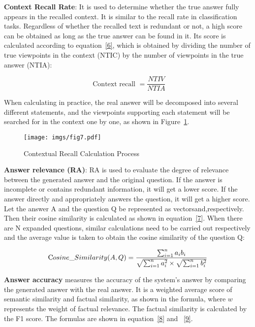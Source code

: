 \textbf{Context Recall Rate}: It is used to determine whether the true answer fully appears in the recalled context. It is similar to the recall rate in classification tasks. Regardless of whether the recalled text is redundant or not, a high score can be obtained as long as the true answer can be found in it. Its score is calculated according to equation~\ref{6}, which is obtained by dividing the number of true viewpoints in the context (NTIC) by the number of viewpoints in the true answer (NTIA): 

\begin{equation}
\text { Context recall }=\frac{NTIV}{NTIA}
\label{6}
\end{equation}

When calculating in practice, the real answer will be decomposed into several different statements, and the viewpoints supporting each statement will be searched for in the context one by one, as shown in Figure~\ref{fig:fig7}.
\begin{figure} [h] \small
    \centering
    \texttt{[image: imgs/fig7.pdf]}
    \vspace{-5pt}
    \caption{Contextual Recall Calculation Process}
    \label{fig:fig7}
\end{figure}


\textbf{Answer relevance (RA)}: RA is used to evaluate the degree of relevance between the generated answer and the original question. If the answer is incomplete or contains redundant information, it will get a lower score. If the answer directly and appropriately answers the question, it will get a higher score. Let the answer A and the question Q be represented as vectorsand,respectively. Then their cosine similarity is calculated as shown in equation~\ref{7}. When there are N expanded questions, similar calculations need to be carried out respectively and the average value is taken to obtain the cosine similarity of the question Q: 

\begin{equation}
\text Cosine\_Similarity(A,Q)=\frac{\sum_{i = 1}^{n}a_{i}b_{i}}{\sqrt{\sum_{i = 1}^{n}a_{i}^{2}}\times\sqrt{\sum_{i = 1}^{n}b_{i}^{2}}}
\label{7}
\end{equation}


\textbf{Answer accuracy} measures the accuracy of the system's answer by comparing the generated answer with the real answer. It is a weighted average score of semantic similarity and factual similarity, as shown in the formula, where $w$ represents the weight of factual relevance. The factual similarity is calculated by the F1 score. The formulas are shown in equation~\ref{8} and ~\ref{9}.

